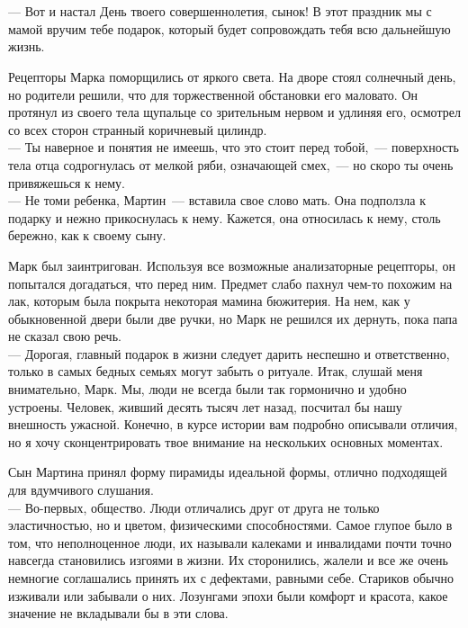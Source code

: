 \newpage
\thispagestyle{empty}
~\\
\newpage

~ 
\vspace{3mm}
 
\noindent --- Вот и настал День твоего совершеннолетия, сынок! В этот праздник 
мы с мамой вручим тебе подарок, который будет сопровождать тебя всю дальнейшую 
жизнь.

Рецепторы Марка поморщились от яркого света. На дворе стоял солнечный день, но 
родители решили, что для торжественной обстановки его маловато. Он протянул из 
своего тела щупальце со зрительным нервом и удлиняя его, осмотрел со всех 
сторон странный коричневый цилиндр.\\
--- Ты наверное и понятия не имеешь, что это стоит перед тобой,~--- поверхность 
тела отца содрогнулась от мелкой ряби, означающей смех,~--- но скоро ты очень 
привяжешься к нему.\\
--- Не томи ребенка, Мартин~--- вставила свое слово мать. Она подползла к 
подарку и нежно прикоснулась к нему. Кажется, она относилась к нему, столь 
бережно, как к своему сыну.

Марк был заинтригован. Используя все возможные анализаторные рецепторы, он 
попытался догадаться, что перед ним. Предмет слабо пахнул чем-то  похожим на 
лак, которым была покрыта некоторая мамина бюжитерия. На нем, как у 
обыкновенной двери были две ручки, но Марк не решился их дернуть, пока папа не 
сказал свою речь.\\
--- Дорогая, главный подарок в жизни следует дарить неспешно и ответственно, 
только в самых бедных семьях могут забыть о ритуале.
Итак, слушай меня внимательно, Марк. Мы, люди не всегда были так гормонично и 
удобно устроены. Человек, живший десять тысяч лет назад, посчитал бы нашу 
внешность ужасной. Конечно, в курсе истории вам подробно описывали отличия, но 
я хочу сконцентрировать твое внимание на нескольких основных моментах.

Сын Мартина принял форму пирамиды идеальной формы, отлично подходящей для 
вдумчивого слушания.\\
--- Во-первых, общество. Люди отличались друг от друга не только эластичностью, 
но и цветом, физическими способностями. Самое глупое было в том, что 
неполноценное люди, их называли калеками и инвалидами почти точно навсегда 
становились изгоями в жизни. Их сторонились, жалели и все же очень немногие 
соглашались принять их с дефектами, равными себе. Стариков обычно изживали или 
забывали о них. Лозунгами эпохи были комфорт и красота, какое значение не 
вкладывали бы в эти слова.

